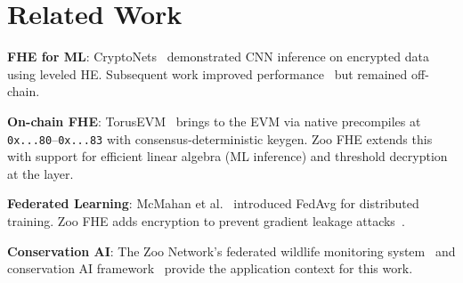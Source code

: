 \section{Related Work}


\textbf{FHE for ML}: CryptoNets~\cite{gilad2016cryptonets} demonstrated CNN inference on encrypted data using leveled HE. Subsequent work improved performance~\cite{brutzkus2019low} but remained off-chain.

\textbf{On-chain FHE}: TorusEVM~\cite{lux-fhevm} brings \TFHE{} to the EVM via native precompiles at \texttt{0x...80}--\texttt{0x...83} with consensus-deterministic keygen. Zoo FHE extends this with \CKKS{} support for efficient linear algebra (ML inference) and threshold decryption at the \TChain{} layer.

\textbf{Federated Learning}: McMahan et al.~\cite{mcmahan2017communication} introduced FedAvg for distributed training. Zoo FHE adds encryption to prevent gradient leakage attacks~\cite{zhu2019deep}.

\textbf{Conservation AI}: The Zoo Network's federated wildlife monitoring system~\cite{zoo-federated-wildlife} and conservation AI framework~\cite{zoo-conservation-ai} provide the application context for this work.

